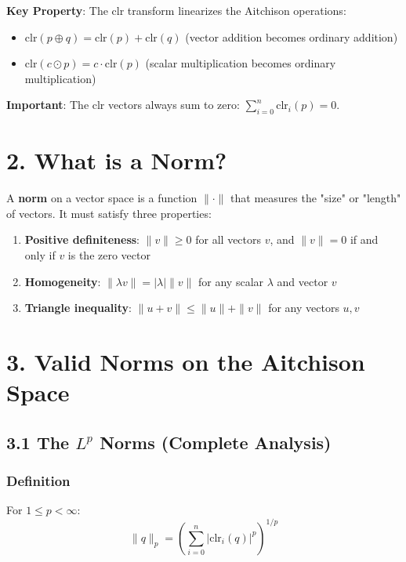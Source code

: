 \documentclass{amsart}
\theoremstyle{plain}
\theoremstyle{definition}
\theoremstyle{remark}
\begin{document}
\textbf{Key Property}: The clr transform linearizes the Aitchison operations:

\begin{itemize}
	\item $\text{clr}(p \oplus q) = \text{clr}(p) + \text{clr}(q)$ (vector addition becomes ordinary addition)
	\item $\text{clr}(c \odot p) = c \cdot \text{clr}(p)$ (scalar multiplication becomes ordinary multiplication)
\end{itemize}

\textbf{Important}: The clr vectors always sum to zero: $\sum_{i=0}^n \text{clr}_i(p) = 0$.

\section{2. What is a Norm?}

A \textbf{norm} on a vector space is a function $\|\cdot\|$ that measures the "size" or "length" of vectors. It must satisfy three properties:

\begin{enumerate}
	\item \textbf{Positive definiteness}: $\|v\| \geq 0$ for all vectors $v$, and $\|v\| = 0$ if and only if $v$ is the zero vector
	\item \textbf{Homogeneity}: $\|\lambda v\| = |\lambda| \|v\|$ for any scalar $\lambda$ and vector $v$
	\item \textbf{Triangle inequality}: $\|u + v\| \leq \|u\| + \|v\|$ for any vectors $u, v$
\end{enumerate}

\section{3. Valid Norms on the Aitchison Space}

\subsection{3.1 The \texorpdfstring{$L^p$}{L^p} Norms (Complete Analysis)}

\subsubsection{Definition}

For $1 \leq p < \infty$:
\[
\|q\|_p = \left( \sum_{i=0}^n |\text{clr}_i(q)|^p \right)^{1/p}
\]
\end{document}
